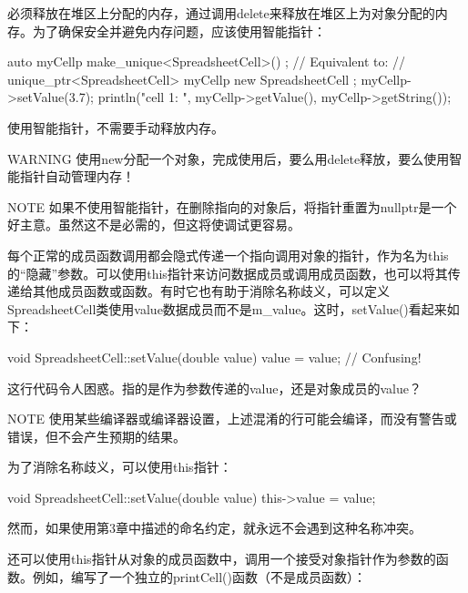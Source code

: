 必须释放在堆区上分配的内存，通过调用delete来释放在堆区上为对象分配的内存。为了确保安全并避免内存问题，应该使用智能指针：

\begin{cpp}
auto myCellp { make_unique<SpreadsheetCell>() };
// Equivalent to:
// unique_ptr<SpreadsheetCell> myCellp { new SpreadsheetCell { } };
myCellp->setValue(3.7);
println("cell 1: {} {}", myCellp->getValue(), myCellp->getString());
\end{cpp}

使用智能指针，不需要手动释放内存。

\begin{myWarning}{WARNING}
使用new分配一个对象，完成使用后，要么用delete释放，要么使用智能指针自动管理内存！
\end{myWarning}

\begin{myNotic}{NOTE}
如果不使用智能指针，在删除指向的对象后，将指针重置为nullptr是一个好主意。虽然这不是必需的，但这将使调试更容易。
\end{myNotic}


每个正常的成员函数调用都会隐式传递一个指向调用对象的指针，作为名为this的“隐藏”参数。可以使用this指针来访问数据成员或调用成员函数，也可以将其传递给其他成员函数或函数。有时它也有助于消除名称歧义，可以定义SpreadsheetCell类使用value数据成员而不是m\_value。这时，setValue()看起来如下：

\begin{cpp}
void SpreadsheetCell::setValue(double value)
{
    value = value; // Confusing!
}
\end{cpp}

这行代码令人困惑。指的是作为参数传递的value，还是对象成员的value？

\begin{myNotic}{NOTE}
使用某些编译器或编译器设置，上述混淆的行可能会编译，而没有警告或错误，但不会产生预期的结果。
\end{myNotic}

为了消除名称歧义，可以使用this指针：

\begin{cpp}
void SpreadsheetCell::setValue(double value)
{
    this->value = value;
}
\end{cpp}

然而，如果使用第3章中描述的命名约定，就永远不会遇到这种名称冲突。

还可以使用this指针从对象的成员函数中，调用一个接受对象指针作为参数的函数。例如，编写了一个独立的printCell()函数（不是成员函数）：

